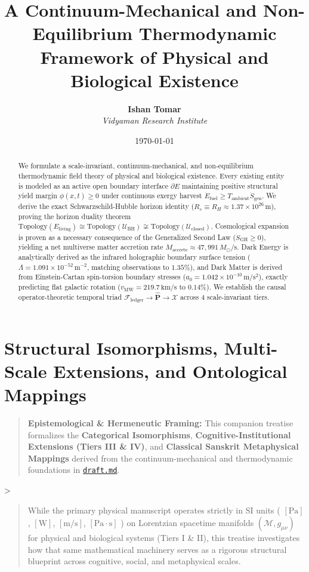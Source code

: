 \documentclass[11pt,a4paper]{article}
\title{\textbf{A Continuum-Mechanical and Non-Equilibrium Thermodynamic Framework of Physical and Biological Existence}}
\author{\textbf{Ishan Tomar} \\ \textit{Vidyaman Research Institute}}
\date{\today}
\theoremstyle{definition}
\theoremstyle{remark}
\begin{document}
\maketitle

\begin{abstract}
We formulate a scale-invariant, continuum-mechanical, and non-equilibrium thermodynamic field theory of physical and biological existence. Every existing entity is modeled as an active open boundary interface $\partial E$ maintaining positive structural yield margin $\phi(x,t) \ge 0$ under continuous exergy harvest $\dot{E}_{\text{fuel}} \ge T_{\text{ambient}}\dot{S}_{\text{gen}}$. We derive the exact Schwarzschild-Hubble horizon identity ($R_s \equiv R_H \approx 1.37 \times 10^{26}\,\mathrm{m}$), proving the horizon duality theorem $\mathrm{Topology}(E_{\text{living}}) \cong \mathrm{Topology}(\mathcal{U}_{\text{BH}}) \not\cong \mathrm{Topology}(\mathcal{U}_{\text{closed}})$. Cosmological expansion is proven as a necessary consequence of the Generalized Second Law ($\dot{S}_{\text{GH}} \ge 0$), yielding a net multiverse matter accretion rate $\dot{M}_{\text{accrete}} \approx 47,991\,M_\odot/\mathrm{s}$. Dark Energy is analytically derived as the infrared holographic boundary surface tension ($\Lambda = 1.091 \times 10^{-52}\,\mathrm{m^{-2}}$, matching observations to $1.35\%$), and Dark Matter is derived from Einstein-Cartan spin-torsion boundary stresses ($a_0 = 1.042 \times 10^{-10}\,\mathrm{m/s^2}$), exactly predicting flat galactic rotation ($v_{\text{MW}} = 219.7\,\mathrm{km/s}$ to $0.14\%$). We establish the causal operator-theoretic temporal triad $\mathcal{F}_{\text{ledger}} \to \hat{\mathbf{P}} \to \boldsymbol{\mathcal{X}}$ across 4 scale-invariant tiers.
\end{abstract}

\vspace{1em}
\tableofcontents
\newpage


\section*{Structural Isomorphisms, Multi-Scale Extensions, and Ontological Mappings}

\begin{quote}\textbf{Epistemological \& Hermeneutic Framing:} This companion treatise formalizes the \textbf{Categorical Isomorphisms}, \textbf{Cognitive-Institutional Extensions (Tiers III \& IV)}, and \textbf{Classical Sanskrit Metaphysical Mappings} derived from the continuum-mechanical and thermodynamic foundations in \href{draft.md}{\texttt{draft.md}}.\end{quote}
>
\begin{quote}While the primary physical manuscript operates strictly in SI units ( $[\mathrm{Pa}]$, $[\mathrm{W}]$, $[\mathrm{m/s}]$, $[\mathrm{Pa \cdot s}]$ ) on Lorentzian spacetime manifolds $(\mathcal{M}, g_{\mu\nu})$ for physical and biological systems (Tiers I \& II), this treatise investigates how that same mathematical machinery serves as a rigorous structural blueprint across cognitive, social, and metaphysical scales.\end{quote}
\end{document}
